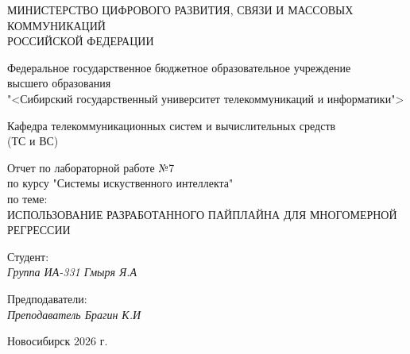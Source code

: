 \thispagestyle{empty}

\begin{center}
    МИНИСТЕРСТВО ЦИФРОВОГО РАЗВИТИЯ, СВЯЗИ И МАССОВЫХ КОММУНИКАЦИЙ \\ РОССИЙСКОЙ ФЕДЕРАЦИИ

    \vspace{20pt}

    Федеральное государственное бюджетное образовательное учреждение  \\  высшего образования \\
    "<Сибирский государственный университет телекоммуникаций и информатики"> \\

    \vspace{20pt}

    Кафедра телекоммуникационных систем и вычислительных средств \\  (ТС и ВС)
\end{center}

\vfill

\begin{center}
    Отчет по лабораторной работе №7 \\  
    по курсу "Системы искуственного интеллекта" \\
    \vspace{20pt}
    по теме: \\
    \uppercase{ ИСПОЛЬЗОВАНИЕ
РАЗРАБОТАННОГО ПАЙПЛАЙНА ДЛЯ МНОГОМЕРНОЙ
РЕГРЕССИИ}
\end{center}

\vfill

    \noindent Студент: \\
    \textit{Группа ИА-331 \hfill Гмыря Я.А} 

    \vspace{20pt}
 
    \noindent Предподаватели: \\
    \textit{Преподаватель \hfill Брагин К.И} \\
\vfill

\begin{center}
    Новосибирск 2026 г.
\end{center}